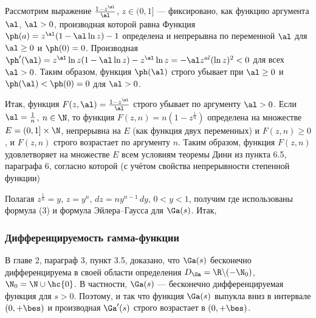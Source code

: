 \documentclass[a4paper]{article}
\begin{document}
Рассмотрим выражение $\frac{1-z^{\al}}{\al}$, $z\in(0,1]$ ---
фиксировано, как функцию аргумента $\al$, $\al>0$, производная
которой равна  Функция $\ph(a) = z^{\al} (1-\al\ln z)-1$ определена и
непрерывна по переменной $\al$ для $\al\ge0$ и $\ph(0)=0$.
Производная $\ph'(\al) = z^{\al} \ln z(1-\al\ln z) - z^{\al}\ln z =
-\al z^{al} (\ln z)^2 < 0$ для всех $\al>0$. Таким образом, функция
$\ph(\al)$ строго убывает при $\al\ge0$ и $\ph(\al)<\ph(0)=0$ для
$\al>0$.

Итак, функция $F(z,\al) = \frac{1-z^{\al}}{\al}$ строго убывает по
аргументу $\al>0$. Если $\al=\frac1n$, $n\in\N$, то функция $F(z,n)
= n(1-z^{\frac1n})$ определена на множестве $E=(0,1]\times\N$,
непрерывна на $E$ (как функция двух переменных) и $F(z,n)\ge0$, и
$F(z,n)$ строго возрастает по аргументу $n$. Таким образом, функция
$F(z,n)$ удовлетворяет на множестве $E$ всем условиям теоремы Дини
из пункта 6.5, параграфа 6, согласно которой (с учётом свойства
непрерывности степенной функции) 

Полагая $z^{\frac1n}=y$, $z=y^n$, $dz=ny^{n-1}\,dy$, $0<y<1$,
получим  где использованы
формула (3) и формула Эйлера--Гаусса для $\Ga(s)$. Итак, 

\subsubsection{Дифференцируемость гамма-функции}

В главе 2, параграф 3, пункт 3.5, доказано, что $\Ga(s)$ бесконечно
дифференцируема в своей области определения $D_{\Ga} =
\R\backslash(-\N_0)$, $\N_0 = \N\cup\hc{0}$. В частности, $\Ga(s)$
--- бесконечно дифференцируемая функция для $s>0$. Поэтому,
 и
 так что функция $\Ga(s)$ выпукла вниз в интервале $(0,+\bes)$
и производная $\Ga'(s)$ строго возрастает в $(0,+\bes)$.
\end{document}
